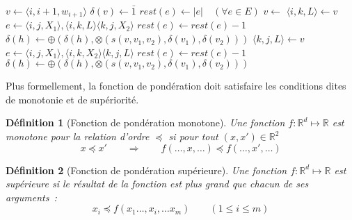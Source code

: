 \documentclass[11pt,openany]{book}
\newtheorem{definition}{Définition}[chapter]
\begin{document}
\begin{algorithm}[htbp]
\begin{algorithmic}
\State $v \gets \langle i,i+1,w_{i+1} \rangle$
\State $\delta(v) \gets \bar{1}$
\State  {}
\EndFor
\State   $rest(e) \gets |e| \quad (\forall e \in E)$ 
\State $v \gets $ 
\State $\langle i , k , L \rangle \gets v$
\State $e \gets \langle i,j , X_1 \rangle , \langle i , k , L \rangle \langle k , j , X_2 \rangle$
\State $rest(e) \gets rest(e) - 1$
\State $\delta(h) \gets \oplus( \delta(h),  \otimes(s(v,v_1,v_2),\delta(v_1),\delta(v_2)))$
\State {}
\EndIf
\EndFor
\EndFor
\State $\langle k , j , L \rangle \gets v$
\State $e \gets \langle i,j , X_1 \rangle , \langle i , k , X_2 \rangle \langle k , j , L \rangle$
\State $rest(e) \gets rest(e) - 1$
\State $\delta(h) \gets \oplus( \delta(h),  \otimes(s(v,v_1,v_2),\delta(v_1),\delta(v_2)))$
\State {}
\EndIf
\EndFor
\EndFor
\EndWhile
\EndFunction
\end{algorithmic}
\caption{\label{algo-knuth-verbose} Algorithme de Knuth (version binaire)}
\end{algorithm}


Plus formellement, la fonction de pondération doit satisfaire les conditions dites de monotonie et de supériorité.
\begin{definition}[Fonction de pondération monotone]
Une fonction $f: \mathbb{R}^d \mapsto \mathbb{R}$ est monotone pour la relation d'ordre $\preceq$ si pour tout $(x,x') \in \mathbb{R}^2$ 
\begin{displaymath}
x \preceq x' \qquad \Rightarrow\qquad f(\ldots,x,\ldots) \preceq f(\ldots,x',\ldots)
\end{displaymath}
\end{definition}
\begin{definition}[Fonction de pondération supérieure]
Une fonction $f: \mathbb{R}^d \mapsto \mathbb{R}$ est supérieure si le résultat de la fonction
est plus grand que chacun de ses arguments~:
\begin{displaymath}
x_i \preceq f(x_1 \ldots,x_i,\ldots x_m) \qquad (1\leq i \leq m )
\end{displaymath}
\end{definition}
\end{document}
